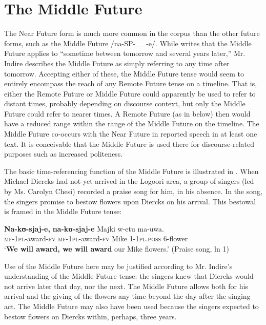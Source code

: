 \documentclass[output=paper]{langsci/langscibook}
\begin{document}
\section{The Middle Future}

The Near Future form is much more common in the corpus than the other future forms, such as the Middle Future /na-SP-\_\_-e/. While \citet[285]{Leung1991} writes that the Middle Future applies to “sometime between tomorrow and several years later,” Mr. Indire describes the Middle Future as simply referring to any time after tomorrow. Accepting either of these, the Middle Future tense would seem to entirely encompass the reach of any Remote Future tense on a timeline. That is, either the Remote Future or Middle Future could apparently be used to refer to distant times, probably depending on discourse context, but only the Middle Future could refer to nearer times. A Remote Future (as in  below) then would have a reduced range within the range of the Middle Future on the timeline. %
%
The Middle Future co-occurs with the Near Future in reported speech in at least one text. It is conceivable that the Middle Future is used there for discourse-related purposes such as increased politeness. 

The basic time-referencing function of the Middle Future is illustrated in . When Michael Diercks had not yet arrived in the Logoori area, a group of singers (led by Ms. Carolyn Chesi) recorded a praise song for him, in his absence. In the song, the singers promise to bestow flowers upon Diercks on his arrival. This bestowal is framed in the Middle Future tense:

\ea\label{ex:sarvasy:12}
\gll \textbf{Na-kʊ-sjaj-e,}    \textbf{na-kʊ-sjaj-e}    Majki  w-etu    ma-uwa. \\
\textsc{mf-1pl}{}-award-\textsc{fv}  \textsc{mf-1pl-}award-\textsc{fv}  Mike  1-\textsc{1pl.poss}  6-flower \\
\glt ‘\textbf{We will award, we will award} our Mike flowers.’ (Praise song, ln 1)
\z

Use of the Middle Future here may be justified according to Mr. Indire’s understanding of the Middle Future tense: the singers knew that Diercks would not arrive later that day, nor the next. The Middle Future allows both for his arrival and the giving of the flowers any time beyond the day after the singing act. The Middle Future may also have been used because the singers expected to bestow flowers on Diercks within, perhaps, three years. 
\end{document}
